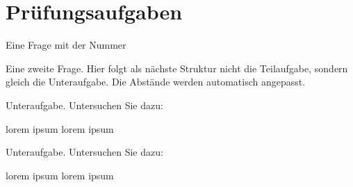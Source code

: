 \documentclass[a4paper,12pt]{article}
\begin{document}
\section{Prüfungsaufgaben}


\begin{question}
	Eine Frage mit der Nummer \thequestion
{}
\end{question}%

\begin{question}
 	
Eine zweite Frage. Hier folgt als nächste Struktur nicht die Teilaufgabe, sondern gleich die Unteraufgabe. Die Abstände werden automatisch angepasst.
\begin{subparts}
		\subpart Unteraufgabe. Untersuchen Sie  dazu:
	\begin{subsubparts}
		\subsubpart lorem ipsum
		\subsubpart lorem ipsum
	\end{subsubparts}
		\subpart Unteraufgabe. Untersuchen Sie  dazu:
	\begin{subsubparts}
		\subsubpart lorem ipsum
		\subsubpart lorem ipsum
	\end{subsubparts}
\end{subparts}
\end{question}
\end{document}
